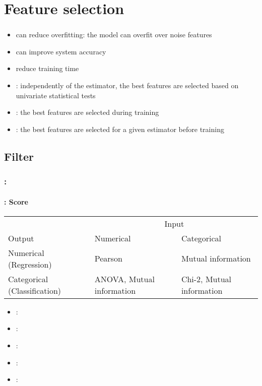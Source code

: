 \documentclass[xcolor=table]{beamer}%
\begin{document}
\section{Feature selection}

\begin{frame}
	\frametitle{\insertshortsubtitle}
	\framesubtitle{\insertsection}
	
	\begin{itemize}
		\item can reduce overfitting: the model can overfit over noise features 
		\item can improve system accuracy
		\item reduce training time
		\item {}: independently of the estimator, the best features are selected based on univariate statistical tests
		\item {}: the best features are selected during training
		\item {}: the best features are selected for a given estimator before training
	\end{itemize}
	
\end{frame}

\subsection{Filter}

\begin{frame}
	\frametitle{\insertshortsubtitle: \insertsection}
	\framesubtitle{\insertsubsection: Score}
	
	\begin{tabular}{p{}p{}p{}}
	& \multicolumn{2}{c}{Input} \\
	\cline{2-3}
	Output	& Numerical & Categorical \\
	\hline
	Numerical \linebreak(Regression) & Pearson & Mutual information \\
	\hline
	Categorical \linebreak(Classification) & ANOVA, \linebreak Mutual information & Chi-2, \linebreak Mutual information\\
	\hline
	\end{tabular}

	\begin{itemize}
		\item {}: 
		\item {}: 
		\item {}: 
		\item {}: 
		\item {}: 
	\end{itemize}
	
\end{frame}
\end{document}
